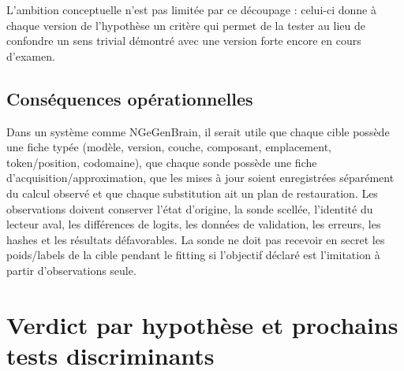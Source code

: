 \documentclass[11pt,a4paper,oneside]{report}
\begin{document}
L'ambition conceptuelle n'est pas limitée par ce découpage : celui-ci donne à chaque version de l'hypothèse un critère qui permet de la tester au lieu de confondre un sens trivial démontré avec une version forte encore en cours d'examen.

\section{Conséquences opérationnelles}
Dans un système comme NGeGenBrain, il serait utile que chaque cible possède une fiche typée (modèle, version, couche, composant, emplacement, token/position, codomaine), que chaque sonde possède une fiche d'acquisition/approximation, que les mises à jour soient enregistrées séparément du calcul observé et que chaque substitution ait un plan de restauration. Les observations doivent conserver l'état d'origine, la sonde scellée, l'identité du lecteur aval, les différences de logits, les données de validation, les erreurs, les hashes et les résultats défavorables. La sonde ne doit pas recevoir en secret les poids/labels de la cible pendant le fitting si l'objectif déclaré est l'imitation à partir d'observations seule.

\chapter{Verdict par hypothèse et prochains tests discriminants}
\end{document}
